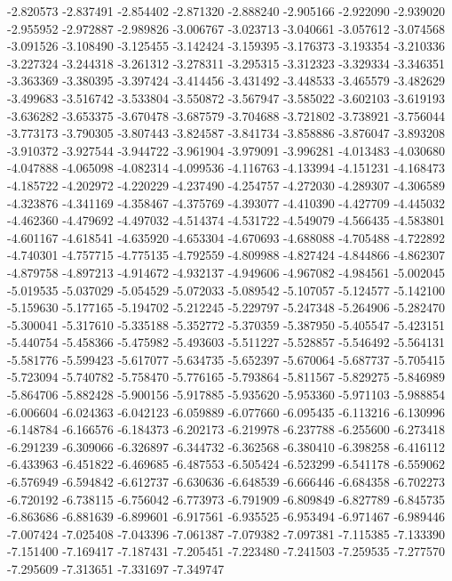 -2.820573
-2.837491
-2.854402
-2.871320
-2.888240
-2.905166
-2.922090
-2.939020
-2.955952
-2.972887
-2.989826
-3.006767
-3.023713
-3.040661
-3.057612
-3.074568
-3.091526
-3.108490
-3.125455
-3.142424
-3.159395
-3.176373
-3.193354
-3.210336
-3.227324
-3.244318
-3.261312
-3.278311
-3.295315
-3.312323
-3.329334
-3.346351
-3.363369
-3.380395
-3.397424
-3.414456
-3.431492
-3.448533
-3.465579
-3.482629
-3.499683
-3.516742
-3.533804
-3.550872
-3.567947
-3.585022
-3.602103
-3.619193
-3.636282
-3.653375
-3.670478
-3.687579
-3.704688
-3.721802
-3.738921
-3.756044
-3.773173
-3.790305
-3.807443
-3.824587
-3.841734
-3.858886
-3.876047
-3.893208
-3.910372
-3.927544
-3.944722
-3.961904
-3.979091
-3.996281
-4.013483
-4.030680
-4.047888
-4.065098
-4.082314
-4.099536
-4.116763
-4.133994
-4.151231
-4.168473
-4.185722
-4.202972
-4.220229
-4.237490
-4.254757
-4.272030
-4.289307
-4.306589
-4.323876
-4.341169
-4.358467
-4.375769
-4.393077
-4.410390
-4.427709
-4.445032
-4.462360
-4.479692
-4.497032
-4.514374
-4.531722
-4.549079
-4.566435
-4.583801
-4.601167
-4.618541
-4.635920
-4.653304
-4.670693
-4.688088
-4.705488
-4.722892
-4.740301
-4.757715
-4.775135
-4.792559
-4.809988
-4.827424
-4.844866
-4.862307
-4.879758
-4.897213
-4.914672
-4.932137
-4.949606
-4.967082
-4.984561
-5.002045
-5.019535
-5.037029
-5.054529
-5.072033
-5.089542
-5.107057
-5.124577
-5.142100
-5.159630
-5.177165
-5.194702
-5.212245
-5.229797
-5.247348
-5.264906
-5.282470
-5.300041
-5.317610
-5.335188
-5.352772
-5.370359
-5.387950
-5.405547
-5.423151
-5.440754
-5.458366
-5.475982
-5.493603
-5.511227
-5.528857
-5.546492
-5.564131
-5.581776
-5.599423
-5.617077
-5.634735
-5.652397
-5.670064
-5.687737
-5.705415
-5.723094
-5.740782
-5.758470
-5.776165
-5.793864
-5.811567
-5.829275
-5.846989
-5.864706
-5.882428
-5.900156
-5.917885
-5.935620
-5.953360
-5.971103
-5.988854
-6.006604
-6.024363
-6.042123
-6.059889
-6.077660
-6.095435
-6.113216
-6.130996
-6.148784
-6.166576
-6.184373
-6.202173
-6.219978
-6.237788
-6.255600
-6.273418
-6.291239
-6.309066
-6.326897
-6.344732
-6.362568
-6.380410
-6.398258
-6.416112
-6.433963
-6.451822
-6.469685
-6.487553
-6.505424
-6.523299
-6.541178
-6.559062
-6.576949
-6.594842
-6.612737
-6.630636
-6.648539
-6.666446
-6.684358
-6.702273
-6.720192
-6.738115
-6.756042
-6.773973
-6.791909
-6.809849
-6.827789
-6.845735
-6.863686
-6.881639
-6.899601
-6.917561
-6.935525
-6.953494
-6.971467
-6.989446
-7.007424
-7.025408
-7.043396
-7.061387
-7.079382
-7.097381
-7.115385
-7.133390
-7.151400
-7.169417
-7.187431
-7.205451
-7.223480
-7.241503
-7.259535
-7.277570
-7.295609
-7.313651
-7.331697
-7.349747
